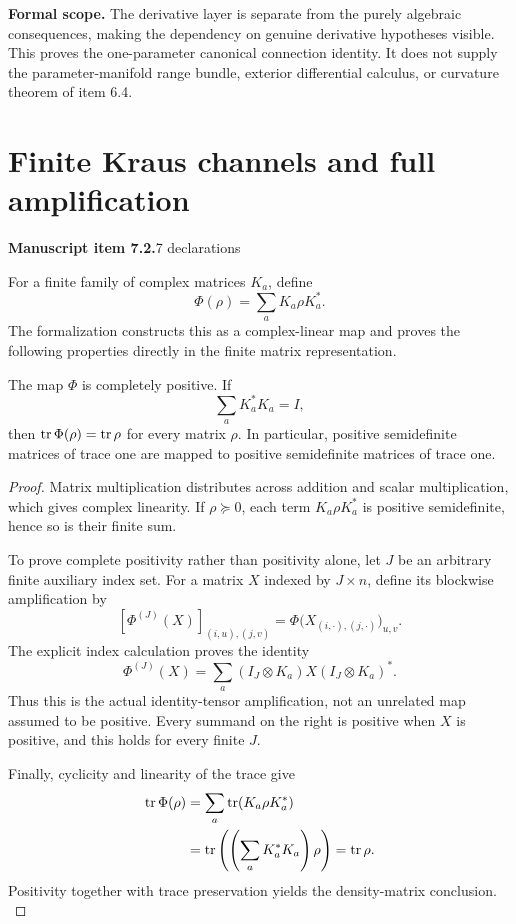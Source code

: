 \textbf{Formal scope.} The derivative layer is separate from the purely algebraic consequences, making the dependency on genuine derivative hypotheses visible. This proves the one-parameter canonical connection identity. It does not supply the parameter-manifold range bundle, exterior differential calculus, or curvature theorem of item 6.4.





\section{Finite Kraus channels and full amplification}\label{supp2:section:005}
\textbf{Manuscript item 7.2.}\quad {}\hfill 7 declarations

For a finite family of complex matrices $K_a$, define
\[
 \Phi(\rho)=\sum_a K_a\rho K_a^*.
\]
The formalization constructs this as a complex-linear map and proves the following properties directly in the finite matrix representation.

\begin{statement}\label{supp2:statement:005}
The map $\Phi$ is completely positive. If
\[
 \sum_aK_a^*K_a=I,
\]
then $\operatorname{tr}\Phi(\rho)=\operatorname{tr}\rho$ for every matrix $\rho$. In particular, positive semidefinite matrices of trace one are mapped to positive semidefinite matrices of trace one.
\end{statement}

\begin{proof}\label{supp2:proof:005}
Matrix multiplication distributes across addition and scalar multiplication, which gives complex linearity. If $\rho\succeq0$, each term $K_a\rho K_a^*$ is positive semidefinite, hence so is their finite sum.

To prove complete positivity rather than positivity alone, let $J$ be an arbitrary finite auxiliary index set. For a matrix $X$ indexed by $J\times n$, define its blockwise amplification by
\[
 [\Phi^{(J)}(X)]_{(i,u),(j,v)}
 =\Phi\bigl(X_{(i,\cdot),(j,\cdot)}\bigr)_{u,v}.
\]
The explicit index calculation proves the identity
\[
 \boxed{\quad
 \Phi^{(J)}(X)=\sum_a (I_J\otimes K_a)X(I_J\otimes K_a)^*.
 \quad}
\]
Thus this is the actual identity-tensor amplification, not an unrelated map assumed to be positive. Every summand on the right is positive when $X$ is positive, and this holds for every finite $J$.

Finally, cyclicity and linearity of the trace give
\begin{align*}
 \operatorname{tr}\Phi(\rho)
 &=\sum_a\operatorname{tr}(K_a\rho K_a^*)\\
 &=\operatorname{tr}\left(\left(\sum_aK_a^*K_a\right)\rho\right)
 =\operatorname{tr}\rho.
\end{align*}
Positivity together with trace preservation yields the density-matrix conclusion.
\label{supp2:proof:005:end}\end{proof}

